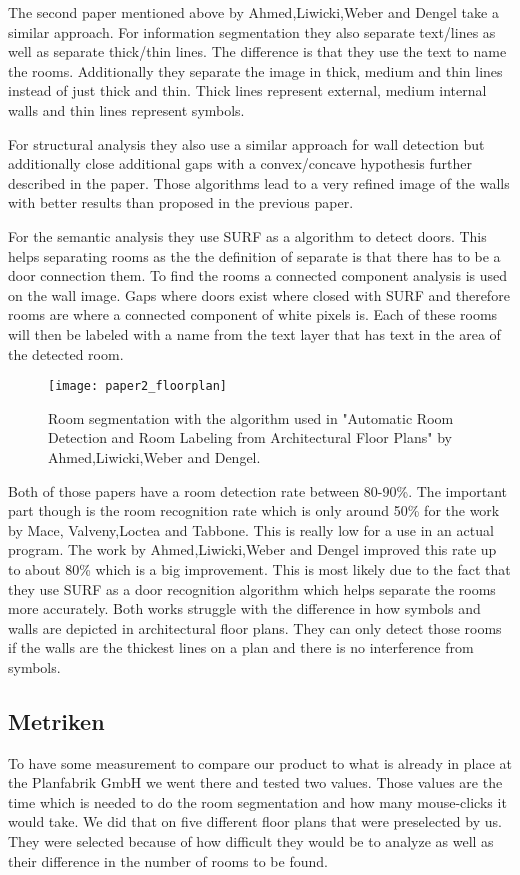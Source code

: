 The second paper mentioned above by Ahmed,Liwicki,Weber and Dengel take a similar approach. For information segmentation they also separate text/lines as well as separate thick/thin lines. The difference is that they use the text to name the rooms. Additionally they separate the image in thick, medium and thin lines instead of just thick and thin. Thick lines represent external, medium internal walls and thin lines represent symbols.

For structural analysis they also use a similar approach for wall detection but additionally close additional gaps with a convex/concave hypothesis further described in the paper. Those algorithms lead to a very refined image of the walls with better results than proposed in the previous paper.

For the semantic analysis they use SURF as a algorithm to detect doors. This helps separating rooms as the the definition of separate is that there has to be a door connection them. To find the rooms a connected component analysis is used on the wall image. Gaps where doors exist where closed with SURF and therefore rooms are where a connected component of white pixels is. Each of these rooms will then be labeled with a name from the text layer that has text in the area of the detected room.

\begin{figure}[h]
	\centering
	\texttt{[image: paper2\_floorplan]}
	\caption{Room segmentation with the algorithm used in "Automatic Room Detection and Room Labeling from Architectural Floor Plans" by Ahmed,Liwicki,Weber and Dengel. }
	\label{fig:paper2_floorplan}
\end{figure}

Both of those papers have a room detection rate between 80-90\%. The important part though is the room recognition rate which is only around 50\% for the work by Mace, Valveny,Loctea and Tabbone. This is really low for a use in an actual program. The work by Ahmed,Liwicki,Weber and Dengel improved this rate up to about 80\% which is a big improvement. This is most likely due to the fact that they use SURF as a door recognition algorithm which helps separate the rooms more accurately. Both works struggle with the difference in how symbols and walls are depicted in architectural floor plans. They can only detect those rooms if the walls are the thickest lines on a plan and there is no interference from symbols.

 

\subsection{Metriken}
To have some measurement to compare our product to what is already in place at the Planfabrik GmbH we went there and tested two values. Those values are the time which is needed to do the room segmentation and how many mouse-clicks it would take. We did that on five different floor plans that were preselected by us. They were selected because of how difficult they would be to analyze as well as their difference in the number of rooms to be found.

